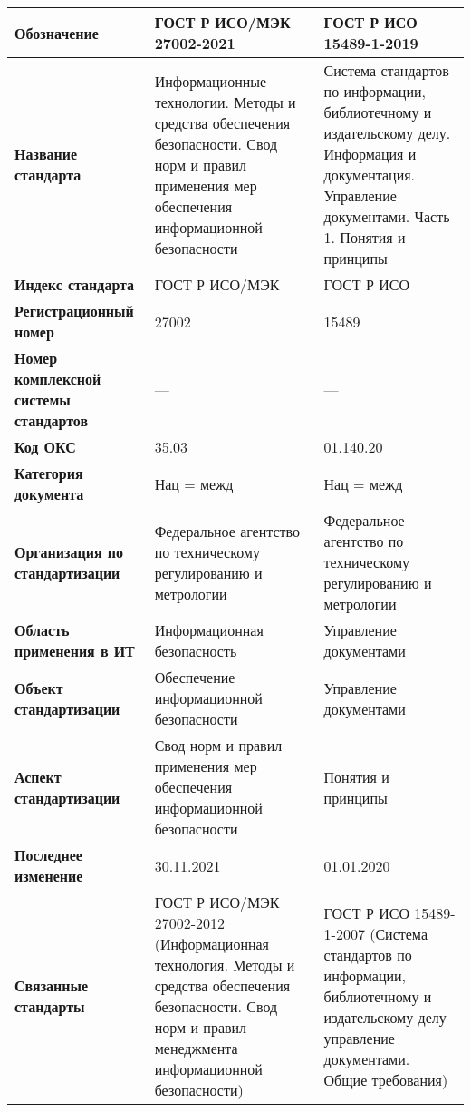 \begin{table}[h!tp]
	\centering
	\caption{}
	\label{table:national:international}
	\begin{tabular}{|p{10em}|p{11em}|p{11em}|}
		\hline
		\textbf{Обозначение}
			& \textbf{ГОСТ Р ИСО/МЭК 27002-2021}
			& \textbf{ГОСТ Р ИСО 15489-1-2019} \\ \hline
		\textbf{Название стандарта}
			& Информационные технологии. Методы и средства обеспечения безопасности. Свод норм и правил применения мер обеспечения информационной безопасности
			& Система стандартов по информации, библиотечному и издательскому делу. Информация и документация. Управление документами. Часть 1. Понятия и принципы \\ \hline
		\textbf{Индекс стандарта}
			& ГОСТ Р ИСО/МЭК & ГОСТ Р ИСО \\ \hline
		\textbf{Регистрационный номер}
			& 27002 & 15489 \\ \hline
		\textbf{Номер комплексной системы стандартов}
			& --- & --- \\ \hline
		\textbf{Код ОКС}
			& 35.03 & 01.140.20 \\ \hline
		\textbf{Категория документа}
			& Нац = межд & Нац = межд \\ \hline
		\textbf{Организация по стандартизации}
			& Федеральное агентство по техническому регулированию и метрологии
			& Федеральное агентство по техническому регулированию и метрологии \\ \hline
		\textbf{Область применения в ИТ}
			& Информационная безопасность & Управление документами \\ \hline
		\textbf{Объект стандартизации}
			& Обеспечение информационной безопасности
			& Управление документами \\ \hline
		\textbf{Аспект стандартизации}
			& Свод норм и правил применения мер обеспечения информационной безопасности
			& Понятия и принципы \\ \hline
		\textbf{Последнее изменение}
			& 30.11.2021 & 01.01.2020 \\ \hline
		\textbf{Связанные стандарты}
			& ГОСТ Р ИСО/МЭК 27002-2012 (Информационная технология.
			Методы и средства обеспечения безопасности.
			Свод норм и правил менеджмента информационной безопасности)
			& ГОСТ Р ИСО 15489-1-2007 (Система стандартов по информации,
			библиотечному и издательскому делу управление документами.
			Общие требования) \\ \hline
	\end{tabular}
\end{table}

